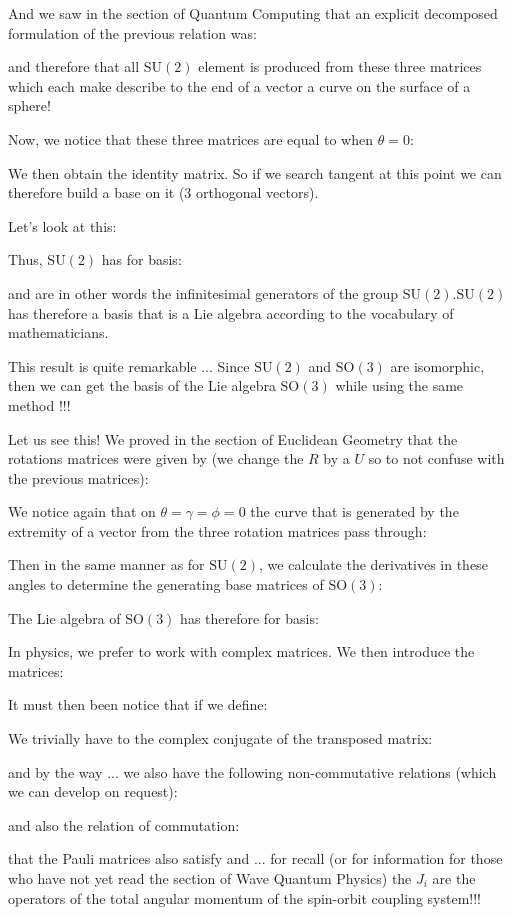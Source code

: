 	And we saw in the section of Quantum Computing that an explicit decomposed formulation of  the previous relation was:
	
	and therefore that all $\text{SU}(2)$ element is produced from these three matrices which each make describe to the end of a vector a curve on the surface of a sphere!
	
	Now, we notice that these three matrices are equal to when $\theta=0$:
	
	We then obtain the identity matrix. So if we search tangent at this point we can therefore build a base on it ($3$ orthogonal vectors).
	
	Let's look at this:
	
	Thus, $\text{SU}(2)$ has for basis:
	
	and are in other words the infinitesimal generators of the group $\text{SU}(2)$.$\text{SU}(2)$ has therefore a basis that is a Lie algebra according to the vocabulary of mathematicians.
	
	This result is quite remarkable ... Since $\text{SU} (2)$ and $\text{SO} (3)$ are isomorphic, then we can get the basis of the Lie algebra $\text{SO} (3)$ while using the same method !!!
	
	Let us see this! We proved in the section of Euclidean Geometry that the rotations matrices were given by (we change the $R$ by a $U$ so to not confuse with the previous matrices):
	
	We notice again that on 
$\theta=\gamma=\phi=0$ the curve that is generated by the extremity of a vector from the three rotation matrices pass through:
	
	Then in the same manner as for $\text{SU} (2)$, we calculate the derivatives in these angles to determine the generating base matrices of $\text{SO} (3)$:
	
	The Lie algebra of $\text{SO} (3)$ has therefore for basis:
	
	In physics, we prefer to work with complex matrices. We then introduce the matrices:
	
	It must then been notice that if we define:
	
	We trivially have to the complex conjugate of the transposed matrix:
	
	and by the way ... we also have the following non-commutative relations (which we can develop on request):
	
	and also the relation of commutation:
	
	that the Pauli matrices also satisfy and ... for recall (or for information for those who have not yet read the section of Wave Quantum Physics) the $J_i$ are the operators of the total angular momentum of the spin-orbit coupling system!!!
	
